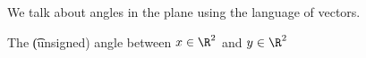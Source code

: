 
We talk about angles in the plane using the language of vectors.

The \t{(unsigned) angle} between $x \in \R^2$ and $y \in \R^2$

\blankpage
